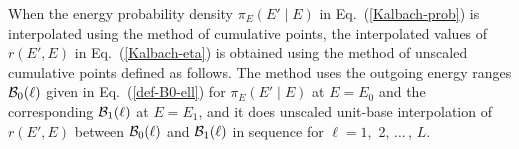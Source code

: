 When the energy probability density $\pi_E( E' \mid E )$ in Eq.~(\ref{Kalbach-prob})
is interpolated using the method of cumulative points, the interpolated values of
$r(E', E)$ in Eq.~(\ref{Kalbach-eta}) is obtained using the method of
unscaled cumulative points defined as follows.  The method uses the outgoing energy
ranges ${\cal B}_0( \ell )$ given in Eq.~(\ref{def-B0-ell}) for $\pi_E( E' \mid E )$ at
$E = E_0$ and the corresponding ${\cal B}_1( \ell )$ at $E = E_1$, and it does unscaled
unit-base interpolation of $r( E', E)$ between ${\cal B}_0( \ell )$ and ${\cal B}_1( \ell )$
in sequence for $\ell = 1,$ 2, $\ldots\,$, $L$.



